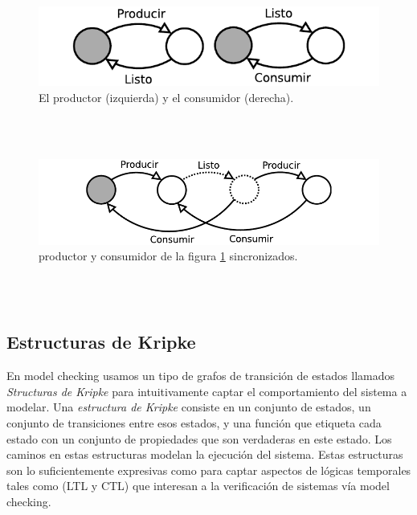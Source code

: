 \documentclass[titlepage, 12pt]{book}
\begin{document}
\begin{figure}[H] %
  \centering
    \includegraphics{Imagenes/prodYcons.pdf}
  \caption{El productor (izquierda) y el consumidor (derecha).}
  \label{figura1}
\end{figure}
~\\\\

\begin{figure}[H] %
  \centering
    \includegraphics{Imagenes/prodYconsSincro.pdf}
  \caption{productor y consumidor de la figura \ref{figura1} sincronizados.}
  \label{figura2}
\end{figure}
~\\\\

\subsection{Estructuras de Kripke}
En model checking usamos un tipo de grafos de transición de estados llamados \textit{Structuras de Kripke} para intuitivamente captar el comportamiento del sistema a modelar. Una \textit{estructura de Kripke} consiste en un conjunto de estados, un conjunto de transiciones entre esos estados, y una función que etiqueta cada estado con un conjunto de propiedades que son verdaderas en este estado. Los caminos en estas estructuras modelan la ejecución del sistema\cite{Clarke}. Estas estructuras son lo suficientemente expresivas como para captar aspectos de lógicas temporales tales como (LTL y CTL) que interesan a la verificación de sistemas vía model checking.\\
\end{document}

